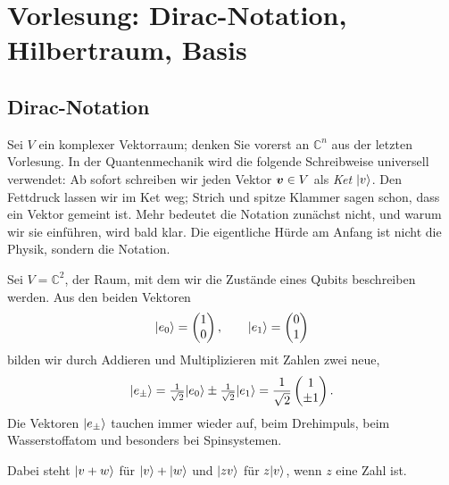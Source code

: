 
\section{Vorlesung: Dirac-Notation, Hilbertraum, Basis}

\subsection{Dirac-Notation}
Sei $V$ ein komplexer Vektorraum; denken Sie vorerst an $\mathbb{C}^n$ aus der letzten Vorlesung. In der Quantenmechanik wird die folgende Schreibweise universell verwendet: Ab sofort schreiben wir jeden Vektor $\boldsymbol{v}\in V$ als \emph{Ket} $\lvert v \rangle$. Den Fettdruck lassen wir im Ket weg; Strich und spitze Klammer sagen schon, dass ein Vektor gemeint ist. Mehr bedeutet die Notation zunächst nicht, und warum wir sie einführen, wird bald klar. Die eigentliche Hürde am Anfang ist nicht die Physik, sondern die Notation.

\begin{beispiel}
	Sei $V = \mathbb{C}^2$, der Raum, mit dem wir die Zustände eines Qubits beschreiben werden. Aus den beiden Vektoren
	\begin{equation}
		\lvert e_0 \rangle = \begin{pmatrix} 1 \\ 0 \end{pmatrix}, \qquad
		\lvert e_1 \rangle = \begin{pmatrix} 0 \\ 1 \end{pmatrix}
	\end{equation}
	bilden wir durch Addieren und Multiplizieren mit Zahlen zwei neue,
	\begin{equation}
		\lvert e_\pm \rangle = \tfrac{1}{\sqrt{2}}\lvert e_0 \rangle \pm \tfrac{1}{\sqrt{2}}\lvert e_1 \rangle
		= \frac{1}{\sqrt{2}} \begin{pmatrix} 1 \\ \pm 1 \end{pmatrix}.
	\end{equation}
	Die Vektoren $\lvert e_\pm \rangle$ tauchen immer wieder auf, beim Drehimpuls, beim Wasserstoffatom und besonders bei Spinsystemen.
\end{beispiel}

Dabei steht $\lvert v + w \rangle$ für $\lvert v \rangle + \lvert w \rangle$ und $\lvert zv \rangle$ für $z\lvert v \rangle$, wenn $z$ eine Zahl ist.


